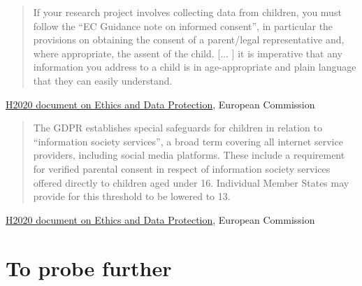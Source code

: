 \documentclass[17pt,aspectratio=169,hyperref={pdfusetitle,colorlinks,allcolors=olive}]{beamer}
\begin{document}
\begin{frame}[fragile]

  {\small
    \begin{quote}
  If your research project involves collecting data from children, you must follow the ``EC Guidance note on informed consent'', in  particular the provisions on obtaining  the  consent  of  a  parent/legal representative  and,  where  appropriate,  the  assent  of  the  child. [... ] it  is imperative that any information you address to a child is in age-appropriate and plain language that they  can  easily  understand.
    \end{quote}

  \begin{flushright}
    \href{https://ec.europa.eu/research/participants/data/ref/h2020/grants_manual/hi/ethics/h2020_hi_ethics-data-protection_en.pdf}{H2020 document on Ethics and Data Protection}, European Commission
  \end{flushright}

  }
  
\end{frame}

\begin{frame}[fragile]

  {\small
    \begin{quote}
The  GDPR establishes special safeguards for children in relation to ``information  society  services'',  a broad term covering all internet service providers, including social media platforms. These include a requirement for verified parental consent in respect of information society services offered directly to  children aged under 16. Individual Member States may  provide for this threshold to  be lowered to 13.
    \end{quote}

  \begin{flushright}
    \href{https://ec.europa.eu/research/participants/data/ref/h2020/grants_manual/hi/ethics/h2020_hi_ethics-data-protection_en.pdf}{H2020 document on Ethics and Data Protection}, European Commission
  \end{flushright}

  }
  
\end{frame}

\section{To probe further}
\end{document}
